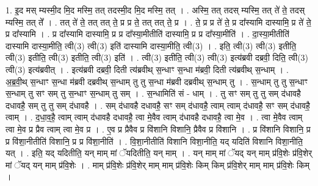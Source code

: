 \documentclass[17pt]{extarticle}
\begin{document}
1. इ॒द मस् म्यस्मी॒द मि॒द मस्मि॒ तत् तदस्मी॒द मि॒द मस्मि॒ तत् । . अस्मि॒ तत् तदस् म्यस्मि॒ तत् ते॑ ते॒ तदस् म्यस्मि॒ तत् ते᳚ । . तत् ते॑ ते॒ तत् तत् ते॒ प्र प्र ते॒ तत् तत् ते॒ प्र । . ते॒ प्र प्र ते॑ ते॒ प्र दा᳚स्यामि दास्यामि॒ प्र ते॑ ते॒ प्र दा᳚स्यामि । . प्र दा᳚स्यामि दास्यामि॒ प्र प्र दा᳚स्या॒मीतीति॑ दास्यामि॒ प्र प्र दा᳚स्या॒मीति॑ । . दा॒स्या॒मीतीति॑ दास्यामि दास्या॒मीति॒ त्वी(3) त्वी(3) इति॑ दास्यामि दास्या॒मीति॒ त्वी(3) । . इति॒ त्वी(3) त्वी(3) इतीति॒ त्वी(3) इतीति॒ त्वी(3) इतीति॒ त्वी(3) इति॑ । . त्वी(3) इतीति॒ त्वी(3) त्वी(3) इत्य॑ब्रवी दब्रवी॒ दिति॒ त्वी(3) त्वी(3) इत्य॑ब्रवीत् । . इत्य॑ब्रवी दब्रवी॒ दिती त्य॑ब्रवीथ् स॒न्धाꣳ स॒न्धा म॑ब्रवी॒ दिती त्य॑ब्रवीथ् स॒न्धाम् । . अ॒ब्र॒वी॒थ् स॒न्धाꣳ स॒न्धा म॑ब्रवी दब्रवीथ् स॒न्धाम् तु तु स॒न्धा म॑ब्रवी दब्रवीथ् स॒न्धाम् तु । . स॒न्धाम् तु तु स॒न्धाꣳ स॒न्धाम् तु सꣳ सम् तु स॒न्धाꣳ स॒न्धाम् तु सम् । . स॒न्धामिति॑ सं - धाम् । . तु सꣳ सम् तु तु सम् द॑धावहै दधावहै॒ सम् तु तु सम् द॑धावहै । . सम् द॑धावहै दधावहै॒ सꣳ सम् द॑धावहै॒ त्वाम् त्वाम् द॑धावहै॒ सꣳ सम् द॑धावहै॒ त्वाम् । . द॒धा॒व॒है॒ त्वाम् त्वाम् द॑धावहै दधावहै॒ त्वा मे॒वैव त्वाम् द॑धावहै दधावहै॒ त्वा मे॒व । . त्वा मे॒वैव त्वाम् त्वा मे॒व प्र प्रैव त्वाम् त्वा मे॒व प्र । . ए॒व प्र प्रैवैव प्र वि॑शानि विशानि॒ प्रैवैव प्र वि॑शानि । . प्र वि॑शानि विशानि॒ प्र प्र वि॑शा॒नीतीति॑ विशानि॒ प्र प्र वि॑शा॒नीति॑ । . वि॒शा॒नीतीति॑ विशानि विशा॒नीति॒ यद् यदिति॑ विशानि विशा॒नीति॒ यत् । . इति॒ यद् यदितीति॒ यन् माम् मां ॅयदितीति॒ यन् माम् । . यन् माम् मां ॅयद् यन् माम् प्र॑वि॒शेः प्र॑वि॒शेर् मां ॅयद् यन् माम् प्र॑वि॒शेः । . माम् प्र॑वि॒शेः प्र॑वि॒शेर् माम् माम् प्र॑वि॒शेः किम् किम् प्र॑वि॒शेर् माम् माम् प्र॑वि॒शेः किम् । \newline
\end{document}
